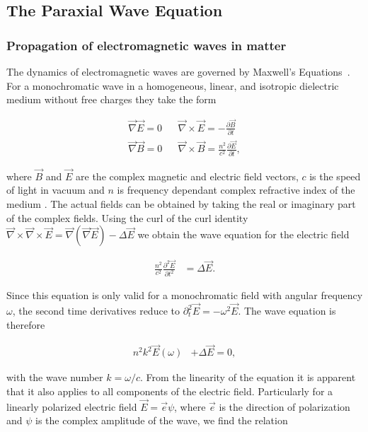 

\subsection{The Paraxial Wave Equation}

\subsubsection{Propagation of electromagnetic waves in matter}

The dynamics of electromagnetic waves are governed by Maxwell's Equations~\cite{PriciplesOfOptics}. For a monochromatic wave in a homogeneous, linear, and isotropic dielectric medium without free charges they take the form

\begin{eqnarray*}
\vec \nabla \vec E = 0 && \vec \nabla \times \vec E = - \frac{ \partial \vec B }{ \partial t }  \\
\vec \nabla \vec B = 0 && \vec \nabla \times \vec B = \frac{n^2}{c^2} \frac{ \partial \vec E }{ \partial t },
\end{eqnarray*}

where $\vec B$ and $\vec E$ are the complex magnetic and electric field vectors, $c$ is the speed of light in vacuum and $n$ is frequency dependant complex refractive index of the medium \cite{attwood2007soft}. The actual fields can be obtained by taking the real or imaginary part of the complex fields. Using the curl of the curl identity $\vec \nabla \times \vec \nabla \times \vec E = \vec \nabla (\vec \nabla  \vec E ) - \Delta  \vec E$ we obtain the wave equation for the electric field

\begin{align} \label{eq:wave_equation} 
\frac{n^2}{c^2} \frac{ \partial^2 \vec E }{ \partial t^2 } & = \Delta \vec E.
\end{align}

Since this equation is only valid for a monochromatic field with angular frequency $\omega$, the second time derivatives reduce to $\partial_t^2 \vec E = - \omega^2 \vec E$. The wave equation is therefore

\begin{align*}
    n^2 k^2 \vec{ E }(\omega) & + \Delta  \vec{ E } = 0 ,
\end{align*}

with the wave number $k = \omega/c$. From the linearity of the equation it is apparent that it also applies to all components of the electric field. Particularly for a linearly polarized electric field $\vec{E} = \vec{e} \psi $, where $\vec{e}$ is the direction of polarization and $\psi$ is the complex amplitude of the wave, we find the relation

